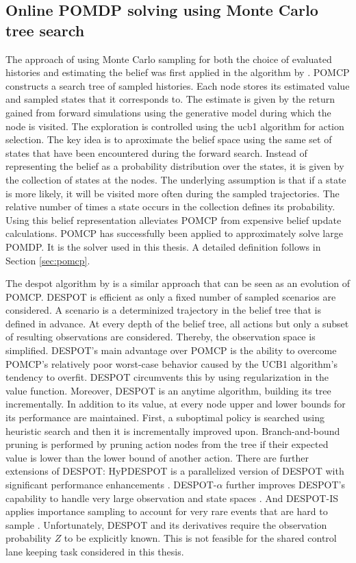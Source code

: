\subsection{Online POMDP solving using Monte Carlo tree search}

The approach of using Monte Carlo sampling for both the choice of evaluated histories and estimating the belief was first applied in the  algorithm by \cite{pomcp}. POMCP constructs a search tree of sampled histories. Each node stores its estimated value and sampled states that it corresponds to. The estimate is given by the return gained from forward simulations using the generative model during which the node is visited. The exploration is controlled using the \gls{ucb1} \parencite{ucb1} algorithm for action selection. The key idea is to aproximate the belief space using the same set of states that have been encountered during the forward search. Instead of representing the belief as a probability distribution over the states, it is given by the collection of states at the nodes. The underlying assumption is that if a state is more likely, it will be visited more often during the sampled trajectories. The relative number of times a state occurs in the collection defines its probability. Using this belief representation alleviates POMCP from expensive belief update calculations. POMCP has successfully been applied to approximately solve large POMDP. It is the solver used in this thesis. A detailed definition follows in Section \ref{sec:pomcp}. 

The \gls{despot} algorithm by \cite{despot} is a similar approach that can be seen as an evolution of POMCP. DESPOT is efficient as only a fixed number of sampled scenarios are considered. A scenario is a determinized trajectory in the belief tree that is defined in advance. At every depth of the belief tree, all actions but only a subset of resulting observations are considered. Thereby, the observation space is simplified. DESPOT's main advantage over POMCP is the ability to overcome POMCP's relatively poor worst-case behavior \parencite{pomcp-worst-case} caused by the UCB1 algorithm's tendency to overfit. DESPOT circumvents this by using regularization in the value function. Moreover, DESPOT is an anytime algorithm, building its tree incrementally. In addition to its value, at every node upper and lower bounds for its performance are maintained. First, a suboptimal policy is searched using heuristic search \parencite{solver_hsvi} and then it is incrementally improved upon. Branch-and-bound pruning is performed by pruning action nodes from the tree if their expected value is lower than the lower bound of another action. There are further extensions of DESPOT: HyPDESPOT is a parallelized version of DESPOT with significant performance enhancements \parencite{hyp-despot}. DESPOT-$\alpha$ further improves DESPOT's capability to handle very large observation and state spaces \parencite{despot-a}. And DESPOT-IS applies importance sampling to account for very rare events that are hard to sample \parencite{despot-is}. Unfortunately, DESPOT and its derivatives require the observation probability $Z$ to be explicitly known. This is not feasible for the shared control lane keeping task considered in this thesis.

